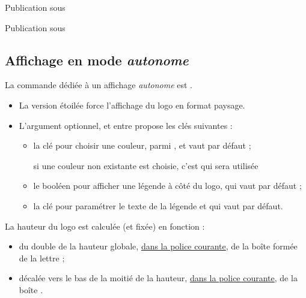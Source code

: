 \documentclass[french,11pt,a4paper]{article}
\begin{document}
\begin{demohigh}[language=latex/latex2,style/main=cyan!10,style/code=cyan!10,style/demo=cyan!10]
\small Publication sous \loetalab*[Couleur=Rouge,Legende, TexteLegende={Licence Etalab 2.0}]
\end{demohigh}

\begin{demohigh}[language=latex/latex2,style/main=cyan!10,style/code=cyan!10,style/demo=cyan!10]
\LARGE\sffamily Publication sous \loetalab[Couleur=Vert,Legende, TexteLegende={Licence Etalab 2.0}]
\end{demohigh}

\subsection{Affichage en mode \textit{autonome}}

La commande dédiée à un affichage \textit{autonome} est .

\medskip

\begin{itemize}[leftmargin=*]
	\item La version étoilée force l'affichage du logo en format paysage.
	\item L'argument optionnel, et entre \MontreCode{[...]} propose les clés suivantes :
	\begin{itemize}
		\item la clé  pour choisir une couleur, parmi , et vaut  par défaut ;
		
		\hfill{\footnotesize si une couleur non existante est choisie, c'est  qui sera utilisée}
		\item le booléen  pour afficher une légende à côté du logo, qui vaut  par défaut ;
		\item la clé  pour paramétrer le texte de la légende et qui vaut  par défaut.
	\end{itemize}
\end{itemize}

\medskip

La hauteur du logo est calculée (et fixée) en fonction :

\begin{itemize}
	\item du double de la hauteur globale, \underline{dans la police courante}, de la boîte formée de la lettre  ;
	\item décalée vers le bas de la moitié de la hauteur, \underline{dans la police courante}, de la boîte .
\end{itemize}
\end{document}

